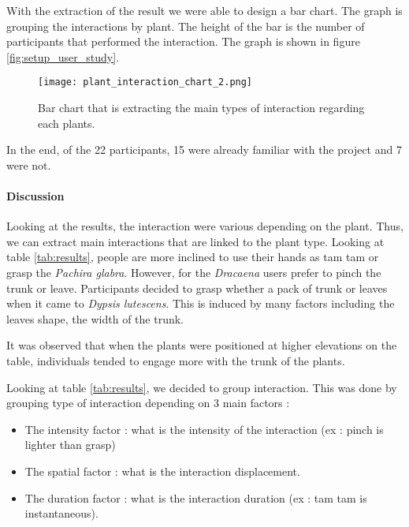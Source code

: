 With the extraction of the result we were able to design a bar chart.
The graph is grouping the interactions by plant. The height of the bar is the number of participants that performed the interaction.
The graph is shown in figure \ref{fig:setup_user_study}.


\begin{figure}[ht]
    \centering
    \texttt{[image: plant\_interaction\_chart\_2.png]}
    \caption{Bar chart that is extracting the main types of interaction regarding each plants.}
    
    \vspace{-0.5cm}
    \label{fig:chart_interaction}
    \vspace{0.2cm}
\end{figure}

In the end, of the 22 participants, 15 were already familiar with the project and 7 were not.

\paragraph{Discussion}
Looking at the results, the interaction were various depending on the plant. 
Thus, we can extract main interactions that are linked to the plant type. 
Looking at table \ref{tab:results}, people are more inclined to use their hands as tam tam or grasp the \textit{Pachira glabra}. 
However, for the \textit{Dracaena} users prefer to pinch the trunk or leave. 
Participants decided to grasp whether a pack of trunk or leaves when it came to \textit{Dypsis lutescens}.
This is induced by many factors including the leaves shape, the width of the trunk.


It was observed that when the plants were positioned at higher elevations on the table, individuals tended to engage more with the trunk of the plants.

Looking at table \ref{tab:results}, we decided to group interaction. This was done by grouping type of interaction depending on 3 main factors :

\begin{itemize}
    \item The intensity factor : what is the intensity of the interaction (ex : pinch is lighter than grasp)
    \item The spatial factor : what is the interaction displacement.
    \item The duration factor : what is the interaction duration (ex : tam tam is instantaneous).
\end{itemize}

